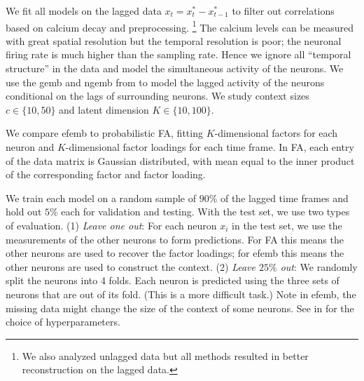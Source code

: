 \documentclass[12pt]{article}
\begin{document}
We fit all models on the lagged data $x_{t} = x^*_t - x^*_{t-1}$ to
filter out correlations based on calcium decay and preprocessing.%
\footnote{We also analyzed unlagged data but all methods
  resulted in better reconstruction on the lagged data.}  The
calcium levels can be measured with great spatial resolution but the
temporal resolution is poor; the neuronal firing rate is much 
higher than the sampling rate. Hence we ignore all ``temporal structure'' 
in the data and model the simultaneous activity of the neurons. We use 
the \gls{gemb} and \gls{ngemb} from  to model the 
lagged activity of the neurons conditional on the lags of surrounding 
neurons. We study context sizes $c \in \{10,50\}$ and latent dimension
$K \in \{10, 100\}$.

 We compare \gls{efemb} to probabilistic \gls{FA},
fitting $K$-dimensional factors for each neuron and $K$-dimensional
factor loadings for each time frame. In \gls{FA}, each entry of the
data matrix is Gaussian distributed, with mean equal to the inner product of the
corresponding factor and factor loading.

  We train each model on a random sample of $90\%$ of the lagged
time frames and hold out $5\%$ each for validation and testing.  With the test
set, we use two types of evaluation.  (1) {\it Leave one out}: For
each neuron $x_{i}$ in the test set, we use the measurements of the
other neurons to form predictions. For \gls{FA} this means the other
neurons are used to recover the factor loadings; for \gls{efemb} this
means the other neurons are used to construct the context.  (2) {\it
  Leave $25 \%$ out}: We randomly split the neurons into 4 folds.
Each neuron is predicted using the three sets of neurons that are out
of its fold.  (This is a more difficult task.)  Note in \gls{efemb},
the missing data might change the size of the context of some neurons.
See  in  for the choice of
hyperparameters.
\end{document}
